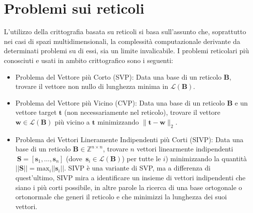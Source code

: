 \section{Problemi sui reticoli}
\label{sec:problemi}
L’utilizzo della crittografia basata su reticoli si basa sull’assunto che, soprattutto nei 
casi di spazi multidimensionali, la complessità computazionale derivante da determinati 
problemi su di essi, sia un limite invalicabile. I problemi reticolari 
più conosciuti e usati in ambito crittografico sono i seguenti:
\begin{itemize}
    \item Problema del Vettore più Corto (SVP): Data una base di un reticolo $\mathbf{B}$, 
    trovare il vettore non nullo di lunghezza minima in $\mathcal{L}(\mathbf{B})$.
    \item Problema del Vettore più Vicino (CVP): Data una base di un reticolo $\mathbf{B}$ e un 
    vettore target $\mathbf{t}$ (non necessariamente nel reticolo), trovare il vettore 
    $\mathbf{w} \in \mathcal{L}(\mathbf{B})$ più vicino a $\mathbf{t}$ minimizzando 
    $\|\mathbf{t}-\mathbf{w}\|_2$.
    \item Problema dei Vettori Lineramente Indipendenti più Corti (SIVP): Data una base di un reticolo 
    $\mathbf{B} \in \mathbb{Z}^{n\times n}$, trovare $n$ vettori linearmente indipendenti 
    $\ {\mathbf{S} = [\mathbf{s}_1, \dots, \mathbf{s}_n]}$ 
    \mbox{(dove  $\mathbf{s}_i \in \mathcal{L}(\mathbf{B})$)}
    per tutte le $i$) minimizzando la quantità 
    ${||\mathbf{S}|| = \text{max}_i||\mathbf{s}_i||}$. 
    SIVP è una variante di SVP, ma a differenza di quest'ultimo, SIVP mira a identificare 
    un insieme di vettori indipendenti che siano i più corti possibile, in altre parole 
    la ricerca di una base ortogonale o ortonormale che generi il reticolo e che minimizzi
     la lunghezza dei suoi vettori.
    \end{itemize}


